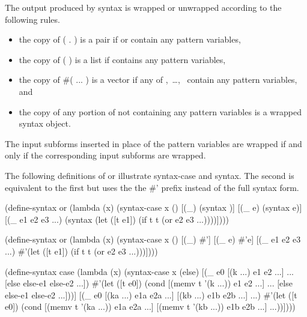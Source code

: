\begin{entry}{%
}
\label{wrappingrules}
The output produced by {\cf syntax} is wrapped or unwrapped according to
the following rules.

\begin{itemize}
\item the copy of {\cf ( .  )} is a pair if 
      or  contain any pattern variables,
\item the copy of {\cf ( )} is a list if 
      contains any pattern variables,
\item the copy of {\cf \#( ... )} is a vector if any of
      ,~\dots,~ contain any pattern variables, and
\item the copy of any portion of  not containing any pattern variables
      is a wrapped syntax object.
\end{itemize}

The input subforms inserted in place of the pattern variables are wrapped
if and only if the corresponding input subforms are wrapped.
\end{entry}

The following definitions of {\cf or} illustrate {\cf syntax-case}
and {\cf syntax}.
The second is equivalent to the first but uses the the {\cf \#'}
prefix instead of the full {\cf syntax} form.

\begin{schemenoindent}
(define-syntax or
  (lambda (x)
    (syntax-case x ()
      [(\_) (syntax \schfalse{})]
      [(\_ e) (syntax e)]
      [(\_ e1 e2 e3 ...)
       (syntax (let ([t e1])
                 (if t t (or e2 e3 ...))))])))

(define-syntax or
  (lambda (x)
    (syntax-case x ()
      [(\_) \#'\schfalse{}]
      [(\_ e) \#'e]
      [(\_ e1 e2 e3 ...)
       \#'(let ([t e1])
           (if t t (or e2 e3 ...)))])))

(define-syntax case
  (lambda (x)
    (syntax-case x (else)
      [(\_ e0 [(k ...) e1 e2 ...] ...
              [else else-e1 else-e2 ...])
       \#'(let ([t e0])
           (cond
             [(memv t '(k ...)) e1 e2 ...]
             ...
             [else else-e1 else-e2 ...]))]
      [(\_ e0 [(ka ...) e1a e2a ...]
              [(kb ...) e1b e2b ...] ...)
       \#'(let ([t e0])
           (cond
             [(memv t '(ka ...)) e1a e2a ...]
             [(memv t '(kb ...)) e1b e2b ...]
             ...))])))
\end{schemenoindent}

